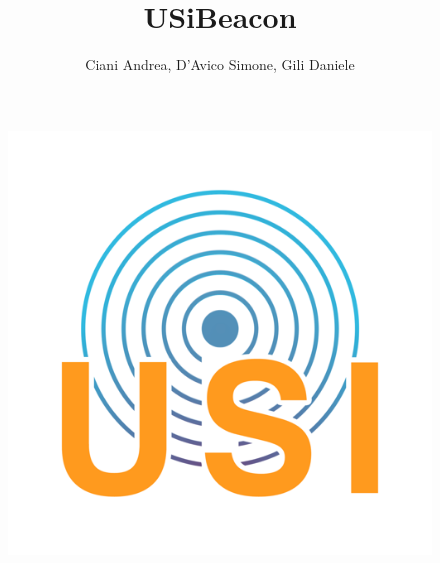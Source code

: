 \documentclass[11pt, oneside]{article}   	%
\title{USiBeacon}
\author{Ciani Andrea, D'Avico Simone, Gili Daniele}
\begin{document}
\maketitle
\begin{figure}[htbp]
\begin{center}
\includegraphics[scale=0.5]{img/logo.png}
\end{center}
\end{figure}

\pagebreak
\tableofcontents




\pagebreak


\pagebreak


\pagebreak


\pagebreak


\pagebreak


\pagebreak



\end{document}
